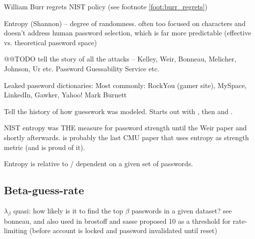 	
	William Burr regrets NIST policy (see footnote \ref{foot:burr_regrets})	
	
	Entropy (Shannon) -- degree of randomness. often too focused on characters and doesn't address human password selection, which is far more predictable 
	(effective vs. theoretical password space)
	
	@@TODO tell the story of all the attacks -- Kelley, Weir, Bonneau, Melicher, Johnson, Ur etc. Password Guessability Service etc. 
	
	Leaked password dictionaries: Most commonly: RockYou (gamer site), MySpace, LinkedIn, Gawker, Yahoo!
	Mark Burnett  \cite{Burnett2005PerfectPasswords} 
	
	Tell the history of how guesswork was modeled. Starts out with \cite{Weir2010MetricsPolicies}, then \cite{Kelley20012GuessAgain} and \cite{Bonneau2012ScienceOfGuessing}. 
	
	NIST entropy was THE measure for password strength until the Weir paper and shortly afterwards. \cite{Komanduri2011OfPasswordsAndPeople} is probably the last CMU paper that uses entropy as strength metric (and is proud of it).
	
	Entropy is relative to / dependent on a given set of passwords. 
	
	\subsection{Beta-guess-rate}
	$\lambda_{\beta}$
	quasi: how likely is it to find the top $\beta$ passwords in a given dataset?
	see bonneau, and also used in \cite{Yang2016MnemonicSentenceBased}
	brostoff and sasse  proposed 10 as a threshold for rate-limiting (before account is locked and password invalidated until reset) \cite{Brostoff2003TenStrikes}
	
	
	
	

